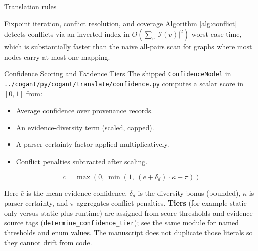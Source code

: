 \documentclass[
  ignorenonframetext,
]{beamer}
\providecommand{\tightlist}{%
  \setlength{\itemsep}{0pt}\setlength{\parskip}{0pt}}
\begin{document}
\begin{frame}[fragile]{Translation rules}
\begin{block}{Fixpoint iteration, conflict resolution, and coverage}
Algorithm \ref{alg:conflict} detects conflicts via an inverted index in
\(O(\sum_v |\mathcal{I}(v)|^2)\) worst-case time, which is substantially
faster than the naive all-pairs scan for graphs where most nodes carry
at most one mapping.
\end{block}
\end{frame}

\begin{frame}[fragile]{Confidence Scoring and Evidence Tiers}
\protect{}\label{confidence-scoring-and-evidence-tiers}
The shipped \texttt{ConfidenceModel} in
\texttt{../cogant/py/cogant/translate/confidence.py} computes a scalar
score in \([0,1]\) from:

\begin{itemize}
\tightlist
\item
  Average confidence over provenance records.
\item
  An evidence-diversity term (scaled, capped).
\item
  A parser certainty factor applied multiplicatively.
\item
  Conflict penalties subtracted after scaling.
\end{itemize}

\begin{equation}
\label{eq:confidence-core}
c = \max\left(0,\ \min\left(1,\ (\bar{e} + \delta_d)\cdot \kappa - \pi\right)\right)
\end{equation}

Here \(\bar{e}\) is the mean evidence confidence, \(\delta_d\) is the
diversity bonus (bounded), \(\kappa\) is parser certainty, and \(\pi\)
aggregates conflict penalties. \textbf{Tiers} (for example static-only
versus static-plus-runtime) are assigned from score thresholds and
evidence source tags (\texttt{determine\_confidence\_tier}); see the
same module for named thresholds and enum values. The manuscript does
not duplicate those literals so they cannot drift from code.
\end{frame}
\end{document}
